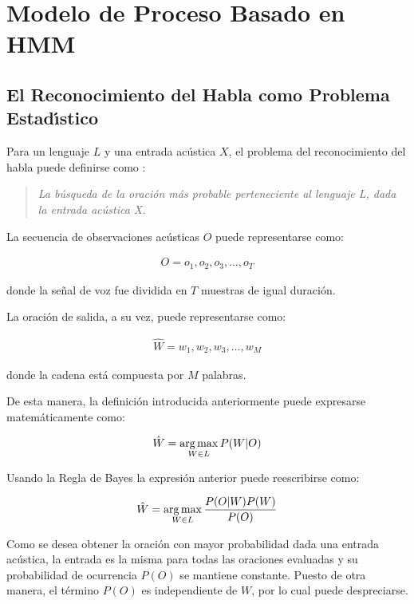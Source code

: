 \section{Modelo de Proceso Basado en HMM}
\label{sec:ModeloHMM}



\subsection{El Reconocimiento del Habla como Problema Estad{\'\i}stico}

Para un lenguaje $L$ y una entrada ac\'ustica $X$, el problema del reconocimiento del habla puede definirse 
como \cite{Jurafsky}:

\begin{quote}
\emph{La b\'usqueda de la oraci\'on m\'as probable perteneciente al lenguaje L, dada la entrada ac\'ustica X.}
\end{quote}

La secuencia de observaciones ac\'usticas $O$ puede representarse como:

\begin{align}
O = o_1,o_2,o_3,\ldots,o_T\label{eq:asrO}
\end{align}

donde la se\~nal de voz fue dividida en $T$ muestras de igual duraci\'on.

La oraci\'on de salida, a su vez, puede representarse como:

\begin{align}
\hat{W}  = w_1,w_2,w_3,\ldots,w_M\label{eq:asrW}
\end{align}

donde la cadena est\'a compuesta por $M$ palabras.

De esta manera, la definici\'on introducida anteriormente puede expresarse matem\'aticamente como:

\begin{align}
\hat{W} = \operatorname*{arg\,max}_{W \in L} P(W|O)
\end{align}

Usando la Regla de Bayes la expresi\'on anterior puede reescribirse como:

\begin{align}
\hat{W} = \operatorname*{arg\,max}_{W \in L} \frac{P(O|W)P(W)}{P(O)}
\end{align}

Como se desea obtener la oraci\'on con mayor probabilidad dada una entrada ac\'ustica, la entrada es
la misma para todas las oraciones evaluadas y su probabilidad de ocurrencia $P(O)$ se mantiene constante.
Puesto de otra manera, el t\'ermino $P(O)$ es independiente de $W$, por lo cual puede despreciarse. 

